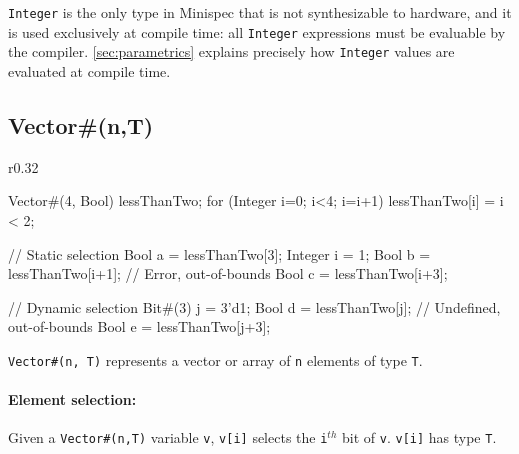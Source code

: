 \verb|Integer| is the only type in Minispec that is not synthesizable to hardware, and it is used exclusively at compile time:
all \verb|Integer| expressions must be evaluable by the compiler.
\autoref{sec:parametrics} explains precisely how \verb|Integer| values are evaluated at compile time.

\subsection{Vector\#(n,T)}
\label{sec:vector}

\begin{wrapfigure}{r}{0.32\columnwidth}
\vspace{-5em}
\begin{mscode}
Vector#(4, Bool) lessThanTwo;
for (Integer i=0; i<4; i=i+1)
  lessThanTwo[i] = i < 2;

// Static selection
Bool a = lessThanTwo[3];
Integer i = 1;
Bool b = lessThanTwo[i+1];
// Error, out-of-bounds
Bool c = lessThanTwo[i+3];

// Dynamic selection
Bit#(3) j = 3'd1;
Bool d = lessThanTwo[j];
// Undefined, out-of-bounds
Bool e = lessThanTwo[j+3];
\end{mscode}
\vspace{-4.5em}
\end{wrapfigure}


\verb|Vector#(n, T)| represents a vector or array of \verb|n| elements of type \verb|T|.

\paragraph{Element selection:} 
Given a \verb|Vector#(n,T)| variable \verb|v|,
\verb|v[i]| selects the \verb|i|$^{th}$ bit of \verb|v|.
\verb|v[i]| has type \verb|T|.

